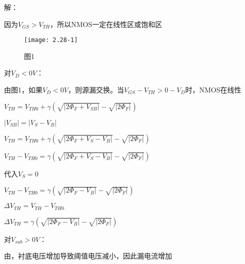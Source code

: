 






解：

因为$V_{GS}>V_{TH}$，所以NMOS一定在线性区或饱和区

		\begin{figure}[H] %
	\begin{minipage}{\linewidth}
		\texttt{[image: 2.28-1]}
	\end{minipage}
	\caption*{图1} %
\end{figure}

对$V_D<0V$：

由图1，如果$V_D<0V$，则源漏交换。当$V_{GS}-V_{TH}>0-V_D$时，NMOS在线性

$V_{TH}=V_{TH0}+\gamma(\sqrt{|2\Phi_F+V_{SB}|}-\sqrt{|2\Phi_F|})$

$|V_{SB}|=|V_S-V_B|$

$V_{TH}=V_{TH0}+\gamma(\sqrt{|2\Phi_F+V_S-V_B|}-\sqrt{|2\Phi_F|})$

$V_{TH}-V_{TH0}=\gamma(\sqrt{|2\Phi_F+V_S-V_B|}-\sqrt{|2\Phi_F|})$

代入$V_S=0$

$V_{TH}-V_{TH0}=\gamma(\sqrt{|2\Phi_F-V_B|}-\sqrt{|2\Phi_F|})$

$\Delta V_{TH}=V_{TH}-V_{TH0}$

$\Delta V_{TH}=\gamma(\sqrt{|2\Phi_F-V_B|}-\sqrt{|2\Phi_F|})$

对$V_{sub}>0V$：

由，衬底电压增加导致阈值电压减小，因此漏电流增加
